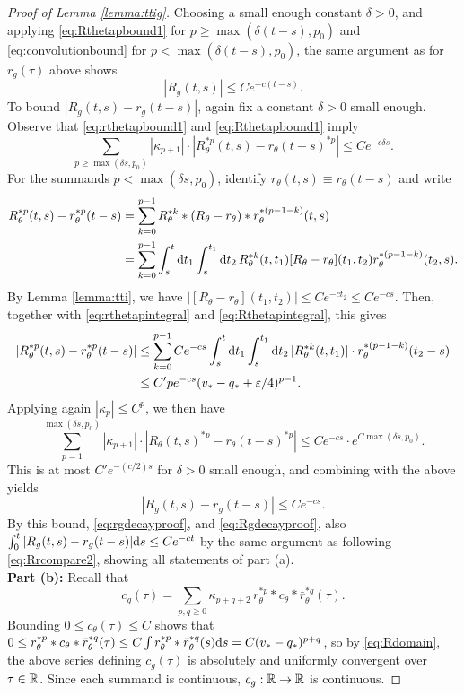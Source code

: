 \begin{proof}[Proof of Lemma \ref{lemma:ttig}]
Choosing a small enough constant $\delta>0$, and
applying \eqref{eq:Rthetapbound1} for $p \geq \max(\delta(t-s),p_0)$
and \eqref{eq:convolutionbound} for $p<\max(\delta(t-s),p_0)$,
the same argument as for $r_g(\tau)$ above shows
\begin{equation}\label{eq:Rgdecayproof}
|R_g(t,s)| \leq Ce^{-c(t-s)}.
\end{equation}
To bound $|R_g(t,s)-r_g(t-s)|$, again fix a constant $\delta>0$ small
enough. Observe that \eqref{eq:rthetapbound1} and \eqref{eq:Rthetapbound1} imply
\[\sum_{p \geq \max(\delta s,p_0)}
|\kappa_{p+1}| \cdot |R^{*p}_\theta(t,s)-r_\theta(t-s)^{*p}|
\leq Ce^{-c\delta s}.\]
For the summands $p<\max(\delta s,p_0)$, identify $r_\theta(t,s) \equiv
r_\theta(t-s)$ and write
\begin{align*}
R_\theta^{*p}(t,s)-r_\theta^{*p}(t-s)
&=\sum_{k=0}^{p-1} R_\theta^{*k} * (R_\theta-r_\theta)
* r_\theta^{*(p-1-k)}(t,s)\\
&=\sum_{k=0}^{p-1} \int_s^t \mathrm{d} t_1
\int_s^{t_1} \mathrm{d} t_2\,R_\theta^{*k}(t,t_1)
[R_\theta-r_\theta](t_1,t_2)
r_\theta^{*(p-1-k)}(t_2,s).
\end{align*}
By Lemma \ref{lemma:tti}, we have $|[R_\theta-r_\theta](t_1,t_2)|
\leq Ce^{-ct_2} \leq Ce^{-cs}$. Then,
together with \eqref{eq:rthetapintegral} and \eqref{eq:Rthetapintegral},
this gives
\begin{align*}
|R_\theta^{*p}(t,s)-r_\theta^{*p}(t-s)|
&\leq \sum_{k=0}^{p-1}
Ce^{-cs} \int_s^t \mathrm{d} t_1 \int_s^{t_1} \mathrm{d} t_2 \, |R_\theta^{*k}(t,t_1)|
\cdot r_\theta^{*(p-1-k)}(t_2-s)\\
&\leq C'pe^{-cs}(v_*-q_*+\varepsilon/4)^{p-1}.
\end{align*}
Applying again $|\kappa_p| \leq C^p$, we then have
\[\sum_{p=1}^{\max(\delta s,p_0)}
|\kappa_{p+1}| \cdot |R_\theta(t,s)^{*p}-r_\theta(t-s)^{*p}|
\leq Ce^{-cs} \cdot e^{C\max(\delta s,p_0)}.\]
This is at most $C'e^{-(c/2)s}$ for $\delta>0$ small enough, and combining with
the above yields
\[|R_g(t,s)-r_g(t-s)| \leq Ce^{-cs}.\]
By this bound, \eqref{eq:rgdecayproof}, and \eqref{eq:Rgdecayproof},
also $\int_0^t |R_g(t,s)-r_g(t-s)|\mathrm{d} s \leq Ce^{-ct}$ by
the same argument as following \eqref{eq:Rrcompare2}, 
showing all statements of part (a).\\

{\bf Part (b):} Recall that
\[c_g(\tau)=\sum_{p,q \geq 0} \kappa_{p+q+2}\,
r_\theta^{*p}*c_\theta*\bar r_\theta^{*q}(\tau).\]
Bounding $0 \leq c_\theta(\tau) \leq C$ shows that
$0 \leq r_\theta^{*p}*c_\theta*\bar r_\theta^{*q}(\tau) \leq
C\int r_\theta^{*p}*\bar r_\theta^{*q}(s)\mathrm{d} s=C(v_*-q_*)^{p+q}$,
so by \eqref{eq:Rdomain}, the above series defining
$c_g(\tau)$ is absolutely and uniformly convergent over $\tau \in \mathbb{R}$.
Since each summand is continuous, $c_g:\mathbb{R} \to \mathbb{R}$ is continuous.


\end{proof}
